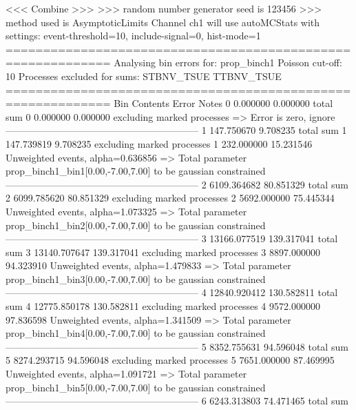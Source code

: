  <<< Combine >>> 
>>> random number generator seed is 123456
>>> method used is AsymptoticLimits
Channel ch1 will use autoMCStats with settings: event-threshold=10, include-signal=0, hist-mode=1
============================================================
Analysing bin errors for: prop_binch1
Poisson cut-off: 10
Processes excluded for sums: STBNV_TSUE TTBNV_TSUE
============================================================
Bin        Contents        Error           Notes                         
0          0.000000        0.000000        total sum                     
0          0.000000        0.000000        excluding marked processes    
  => Error is zero, ignore      
------------------------------------------------------------
1          147.750670      9.708235        total sum                     
1          147.739819      9.708235        excluding marked processes    
1          232.000000      15.231546       Unweighted events, alpha=0.636856
  => Total parameter prop_binch1_bin1[0.00,-7.00,7.00] to be gaussian constrained
------------------------------------------------------------
2          6109.364682     80.851329       total sum                     
2          6099.785620     80.851329       excluding marked processes    
2          5692.000000     75.445344       Unweighted events, alpha=1.073325
  => Total parameter prop_binch1_bin2[0.00,-7.00,7.00] to be gaussian constrained
------------------------------------------------------------
3          13166.077519    139.317041      total sum                     
3          13140.707647    139.317041      excluding marked processes    
3          8897.000000     94.323910       Unweighted events, alpha=1.479833
  => Total parameter prop_binch1_bin3[0.00,-7.00,7.00] to be gaussian constrained
------------------------------------------------------------
4          12840.920412    130.582811      total sum                     
4          12775.850178    130.582811      excluding marked processes    
4          9572.000000     97.836598       Unweighted events, alpha=1.341509
  => Total parameter prop_binch1_bin4[0.00,-7.00,7.00] to be gaussian constrained
------------------------------------------------------------
5          8352.755631     94.596048       total sum                     
5          8274.293715     94.596048       excluding marked processes    
5          7651.000000     87.469995       Unweighted events, alpha=1.091721
  => Total parameter prop_binch1_bin5[0.00,-7.00,7.00] to be gaussian constrained
------------------------------------------------------------
6          6243.313803     74.471465       total sum                     
